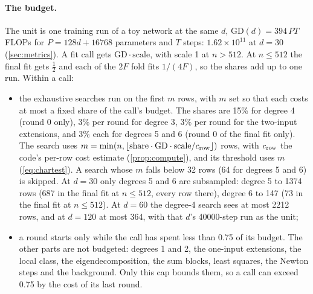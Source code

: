 \paragraph{The budget.} The unit is one training run of a toy network at the same $d$, $\mathrm{GD}(d)=394\,PT$ FLOPs for $P=128d+16768$ parameters and $T$ steps: $1.62\times10^{11}$ at $d=30$ (\cref{sec:metrics}). A fit call gets $\mathrm{GD}\cdot\text{scale}$, with scale 1 at $n>512$. At $n\le512$ the final fit gets $\frac12$ and each of the $2F$ fold fits $1/(4F)$, so the shares add up to one run. Within a call:
\begin{itemize}
\item the exhaustive searches run on the first $m$ rows, with $m$ set so that each costs at most a fixed share of the call's budget. The shares are 15\% for degree 4 (round 0 only), 3\% per round for degree 3, 3\% per round for the two-input extensions, and 3\% each for degrees 5 and 6 (round 0 of the final fit only). The search uses $m=\min(n,\lfloor\text{share}\cdot\mathrm{GD}\cdot\text{scale}/c_{\rm row}\rfloor)$ rows, with $c_{\rm row}$ the code's per-row cost estimate (\cref{prop:compute}), and its threshold uses $m$ (\cref{eq:chartest}). A search whose $m$ falls below 32 rows (64 for degrees 5 and 6) is skipped. At $d=30$ only degrees 5 and 6 are subsampled: degree 5 to 1374 rows (687 in the final fit at $n\le512$, every row there), degree 6 to 147 (73 in the final fit at $n\le512$). At $d=60$ the degree-4 search sees at most 2212 rows, and at $d=120$ at most 364, with that $d$'s 40000-step run as the unit;
\item a round starts only while the call has spent less than 0.75 of its budget. The other parts are not budgeted: degrees 1 and 2, the one-input extensions, the local class, the eigendecomposition, the sum blocks, least squares, the Newton steps and the background. Only this cap bounds them, so a call can exceed 0.75 by the cost of its last round.
\end{itemize}

\begin{table}[t]
\centering{\scriptsize\setlength{\tabcolsep}{3pt}
}
\caption{DFG v1.3's constructor defaults, as run (, every other argument at its default), and constants fixed in its code, with their lines . Source: , read by  (\texttt{tab\_params}). The defaults are read from the constructor's signature, and each fixed constant is checked to occur at the line given.}
\label{tab:params}
\end{table}

